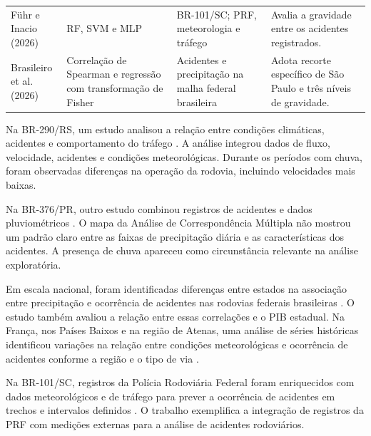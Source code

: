 \documentclass[12pt]{article}
\begin{document}
\begin{table}[htbp]
\begin{tabularx}{\textwidth}{
        >{\RaggedRight\arraybackslash}p{2.7cm}
        >{\RaggedRight\arraybackslash}p{3.0cm}
        >{\RaggedRight\arraybackslash}p{3.7cm}
        >{\RaggedRight\arraybackslash}X
    }
        \addlinespace

        \makecell[l]{Führ e Inacio\\(2026)} &
        RF, SVM e MLP &
        BR-101/SC; PRF, meteorologia e tráfego &
        Avalia a gravidade entre os acidentes registrados. \\

        \addlinespace

        \makecell[l]{Brasileiro et al.\\(2026)} &
        Correlação de Spearman e regressão com transformação de Fisher &
        Acidentes e precipitação na malha federal brasileira &
        Adota recorte específico de São Paulo e três níveis de gravidade. \\

        \bottomrule
    \end{tabularx}
\end{table}

Na BR-290/RS, um estudo analisou a relação entre condições climáticas,
acidentes e comportamento do tráfego \cite{caleffi2016}. A análise integrou
dados de fluxo, velocidade, acidentes e condições meteorológicas. Durante
os períodos com chuva, foram observadas diferenças na operação da rodovia,
incluindo velocidades mais baixas.

Na BR-376/PR, outro estudo combinou registros de acidentes e dados
pluviométricos \cite{silva2020}. O mapa da Análise de Correspondência
Múltipla não mostrou um padrão claro entre as faixas de precipitação
diária e as características dos acidentes. A presença de chuva apareceu
como circunstância relevante na análise exploratória.

Em escala nacional, foram identificadas diferenças entre estados na
associação entre precipitação e ocorrência de acidentes nas rodovias
federais brasileiras \cite{brasileiro2026}. O estudo também avaliou a
relação entre essas correlações e o PIB estadual. Na França, nos Países
Baixos e na região de Atenas, uma análise de séries históricas identificou
variações na relação entre condições meteorológicas e ocorrência de
acidentes conforme a região e o tipo de via \cite{bergel2013}.

Na BR-101/SC, registros da Polícia Rodoviária Federal foram enriquecidos
com dados meteorológicos e de tráfego para prever a ocorrência de
acidentes em trechos e intervalos definidos \cite{fuhr2026}. O trabalho
exemplifica a integração de registros da PRF com medições externas para
a análise de acidentes rodoviários.
\end{document}
